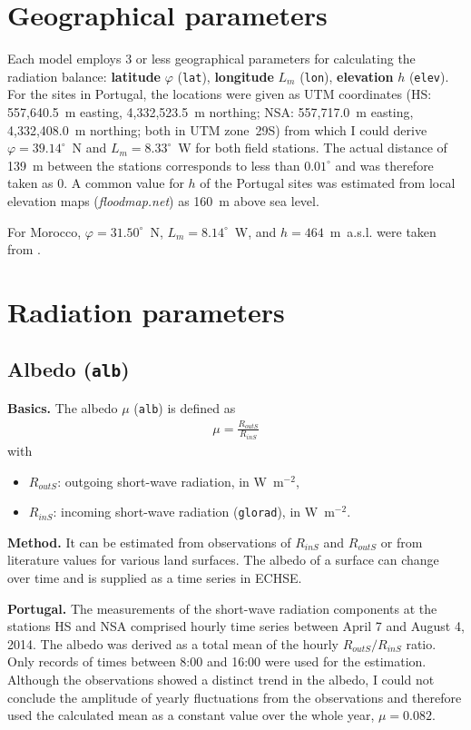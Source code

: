 \documentclass{scrreprt}
\newenvironment{denseitem}{
  \begin{itemize}
    \setlength{\itemsep}{0pt}
    \setlength{\parskip}{0pt}
    \setlength{\parsep}{0pt}
}{
  \end{itemize}
}
\begin{document}
\section{Geographical parameters} \label{sec:parest_geo}

Each model employs 3 or less geographical parameters for calculating the radiation balance: \textbf{latitude} $\varphi$ (\verb!lat!), \textbf{longitude} $L_m$ (\verb!lon!), \textbf{elevation} $h$ (\verb!elev!).
For the sites in Portugal, the locations were given as UTM coordinates (HS: 557,640.5~m easting, 4,332,523.5~m northing; NSA: 557,717.0~m easting, 4,332,408.0~m northing; both in UTM zone~29S) from which I could derive $\varphi = 39.14^\circ$~N and $L_m= 8.33^\circ$~W for both field stations.
The actual distance of 139~m between the stations corresponds to less than $0.01^\circ$ and was therefore taken as 0.
A common value for $h$ of the Portugal sites was estimated from local elevation maps (\emph{floodmap.net}) as 160~m above sea level.

For Morocco, $\varphi = 31.50^\circ$~N, $L_m = 8.14^\circ$~W, and $h = 464$~m~a.s.l. were taken from \citet{mroos14}.

\section{Radiation parameters} \label{sec:parest_rad}

\subsection{Albedo (\texttt{alb})} \label{ssec:parest_rad_alb}

\textbf{Basics.}
The albedo $\mu$ (\verb!alb!) is defined as
\begin{align*}
  \mu = \frac{R_{outS}}{R_{inS}}
\end{align*}
%
with
\begin{denseitem}
  \item[] $R_{outS}$: outgoing short-wave radiation, in W~m$^{-2}$,
  \item[] $R_{inS}$: incoming short-wave radiation (\verb!glorad!), in W~m$^{-2}$.
\end{denseitem}

\textbf{Method.}
It can be estimated from observations of $R_{inS}$ and $R_{outS}$ or from literature values for various land surfaces.
The albedo of a surface can change over time and is supplied as a time series in ECHSE.

\textbf{Portugal.}
The measurements of the short-wave radiation components at the stations HS and NSA comprised hourly time series between April 7 and August 4, 2014.
The albedo was derived as a total mean of the hourly $R_{outS}/R_{inS}$ ratio.
Only records of times between 8:00 and 16:00 were used for the estimation.
Although the observations showed a distinct trend in the albedo, I could not conclude the amplitude of yearly fluctuations from the observations and therefore used the calculated mean as a constant value over the whole year, $\mu = 0.082$.
\end{document}
